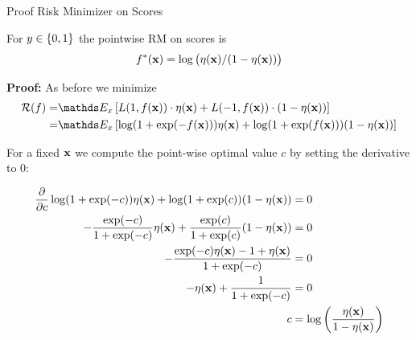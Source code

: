 \documentclass[11pt,compress,t,notes=noshow, xcolor=table]{beamer}
\begin{document}
\begin{framev}[fs=small]{Proof Risk Minimizer on Scores}

For $y \in \{0, 1\}$ the pointwise RM on scores is 
$$f^{\ast}(\mathbf{x}) =  \log \big(\eta(\mathbf{x})/(1-\eta(\mathbf{x}) )\big)$$

\textbf{Proof: } As before we minimize 
\begin{align*}
\riskf =& \E_x \left[L(1, \fx) \cdot \eta(\xv) + L(-1, \fx) \cdot (1 - \eta(\xv)) \right] \\
=& \E_x \left[ \log(1 + \exp(- \fx)) \eta(\xv)+ \log(1 + \exp(\fx)) (1 - \eta(\xv)) \right] 
\end{align*}

For a fixed $\mathbf{x}$ we compute the point-wise optimal value $c$ by setting the derivative to $0$: 

\begin{footnotesize}
\begin{align*}
\frac{\partial }{\partial c} \log(1 + \exp(-c)) \eta(\mathbf{x})+ \log(1 + \exp(c)) (1 - \eta(\mathbf{x})) &= 0 \\
- \frac{\exp(-c)}{1 + \exp(-c)} \eta(\mathbf{x}) + \frac{\exp(c)}{1 + \exp(c)} (1 - \eta(\mathbf{x})) &= 0 \\ 
- \frac{\exp(-c) \eta(\mathbf{x}) - 1 + \eta(\mathbf{x})}{1 + \exp(-c)} &= 0 \\
- \eta(\mathbf{x}) + \frac{1}{1 + \exp(-c)} &= 0\\
c &= \log\left(\frac{\eta(\mathbf{x})}{1 - \eta(\mathbf{x})}\right)
\end{align*}
\end{footnotesize}

\end{framev}
\end{document}
